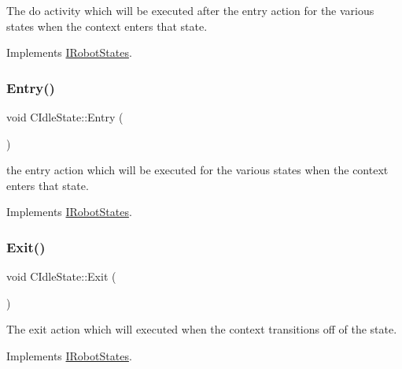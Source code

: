 The do activity which will be executed after the entry action for the various states when the context enters that state. 



Implements \hyperlink{classIRobotStates_aa681381e72738a2870c3f13f552a2e93}{I\+Robot\+States}.

\mbox{\label{classCIdleState_afcfc7e601c50b99c27380b9541fc3795}} 
\subsubsection{\texorpdfstring{Entry()}{Entry()}}
{\footnotesize\ttfamily void C\+Idle\+State\+::\+Entry (\begin{DoxyParamCaption}{ }\end{DoxyParamCaption})\hspace{0.3cm}{\ttfamily [virtual]}}



the entry action which will be executed for the various states when the context enters that state. 



Implements \hyperlink{classIRobotStates_af43ddb52f5100b42c3d11b71fb1f10dd}{I\+Robot\+States}.

\mbox{\label{classCIdleState_a634bf12d9a7f29504c7dc6df7d419835}} 
\subsubsection{\texorpdfstring{Exit()}{Exit()}}
{\footnotesize\ttfamily void C\+Idle\+State\+::\+Exit (\begin{DoxyParamCaption}{ }\end{DoxyParamCaption})\hspace{0.3cm}{\ttfamily [virtual]}}



The exit action which will executed when the context transitions off of the state. 



Implements \hyperlink{classIRobotStates_a099417875e67f047ca38e08890491529}{I\+Robot\+States}.

\mbox{\label{classCIdleState_a12d0c6b590c56cdc9018524d632d4871}} 
